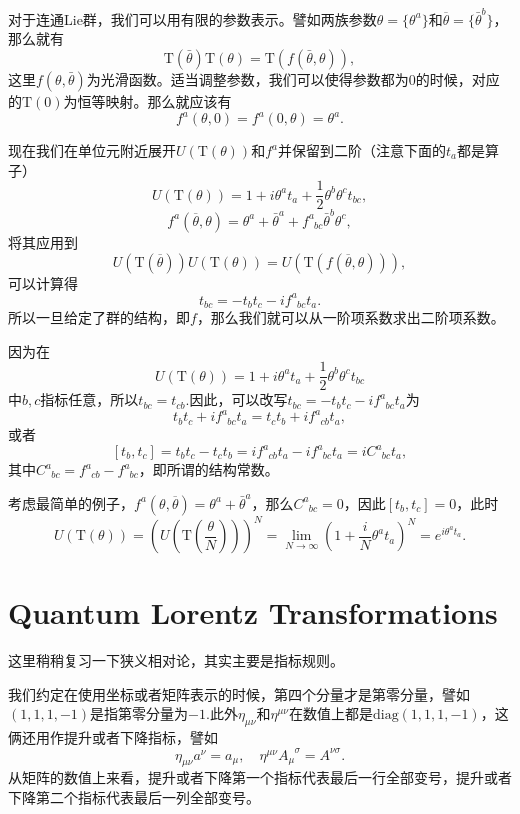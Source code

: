 \documentclass[9pt]{extbook}
\begin{document}
对于连通Lie群，我们可以用有限的参数表示。譬如两族参数$\theta=\{\theta^a\}$和$\overline{\theta}=\{\bar{\theta}^b\}$，那么就有
\[
\mathrm{T}(\bar{\theta})\mathrm{T}(\theta)=\mathrm{T}(f(\bar{\theta},\theta)),
\]
这里$f(\theta,\bar{\theta})$为光滑函数。适当调整参数，我们可以使得参数都为0的时候，对应的$\mathrm{T}(0)$为恒等映射。那么就应该有
\[
f^a(\theta,0)=f^a(0,\theta)=\theta^a.
\]

现在我们在单位元附近展开$U(\mathrm{T}(\theta))$和$f^a$并保留到二阶（注意下面的$t_a$都是算子）
\[
U(\mathrm{T}(\theta))=1+i\theta^at_a+\frac{1}{2}\theta^b\theta^ct_{bc},
\]
\[
f^a(\overline{\theta},\theta)=\theta^a+\bar{\theta}^a+f^a_{\phantom{a}bc}\bar{\theta}^b\theta^c,
\]
将其应用到
\[
U(\mathrm{T}(\overline{\theta}))U(\mathrm{T}(\theta))=U(\mathrm{T}(f(\overline{\theta},\theta))),
\]
可以计算得
\[
t_{bc}=-t_bt_c-if^a_{\phantom{a}bc}t_a.
\]
所以一旦给定了群的结构，即$f$，那么我们就可以从一阶项系数求出二阶项系数。

因为在
\[
U(\mathrm{T}(\theta))=1+i\theta^at_a+\frac{1}{2}\theta^b\theta^ct_{bc}
\]
中$b,c$指标任意，所以$t_{bc}=t_{cb}$.因此，可以改写$t_{bc}=-t_bt_c-if^a_{\phantom{a}bc}t_a$为
\[
t_bt_c+if^a_{\phantom{a}bc}t_a=t_ct_b+if^a_{\phantom{a}cb}t_a,
\]
或者
\[
[t_b,t_c]=t_bt_c-t_ct_b=if^a_{\phantom{a}cb}t_a-if^a_{\phantom{a}bc}t_a=iC^a_{\phantom{a}bc}t_a,
\]
其中$C^a_{\phantom{a}bc}=f^a_{\phantom{a}cb}-f^a_{\phantom{a}bc}$，即所谓的结构常数。

考虑最简单的例子，$f^a(\theta,\overline{\theta})=\theta^a+\bar{\theta}^a$，那么$C^a_{\phantom{a}bc}=0$，因此$[t_b,t_c]=0$，此时
\[
U(\mathrm{T}(\theta))=\left(U\left(\mathrm{T}\left(\frac{\theta}{N}\right)\right)\right)^N=\lim_{N\to \infty}\left(1+\frac{i}{N}\theta^at_a\right)^N=e^{i\theta^at_a}.
\]
\section{Quantum Lorentz Transformations}
这里稍稍复习一下狭义相对论，其实主要是指标规则。

我们约定在使用坐标或者矩阵表示的时候，第四个分量才是第零分量，譬如$(1,1,1,-1)$是指第零分量为$-1$.此外$\eta_{\mu\nu}$和$\eta^{\mu\nu}$在数值上都是$\mathrm{diag}(1,1,1,-1)$，这俩还用作提升或者下降指标，譬如
\[
\eta_{\mu\nu}a^\nu=a_\mu,\quad \eta^{\mu\nu}A_\mu^{\phantom{\mu}\sigma}=A^{\nu\sigma}.
\]
从矩阵的数值上来看，提升或者下降第一个指标代表最后一行全部变号，提升或者下降第二个指标代表最后一列全部变号。
\end{document}
